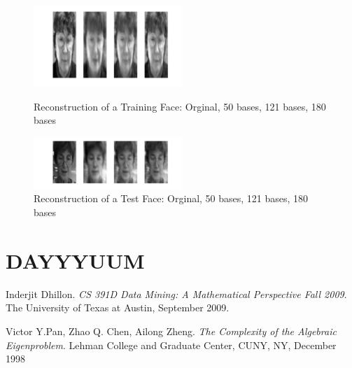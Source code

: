 \documentclass[10pt,twocolumn,letterpaper]{article}
\begin{document}
\begin{figure}[H]
\begin{center}
\includegraphics[width=0.5\textwidth]{../results/Train1_reco}

  \caption{Reconstruction of a Training Face: Orginal, 50 bases, 121 bases, 180 bases \label{fig:RecoTrain1}}
  
  \includegraphics[width=0.5\textwidth]{../results/Test1_reco}

  \caption{Reconstruction of a Test Face: Orginal, 50 bases, 121 bases, 180 bases \label{fig:RecoTest1}}

\end{center}
\end{figure}


\section{DAYYYUUM}



{\small


}

\begin{thebibliography}{9}
Inderjit Dhillon. 
\textit{CS 391D Data Mining: A Mathematical Perspective Fall 2009}. 
The University of Texas at Austin, September 2009.

Victor Y.Pan, Zhao Q. Chen, Ailong Zheng. 
\textit{The Complexity of the Algebraic Eigenproblem}. 
Lehman College and Graduate Center, CUNY, NY, December 1998
\end{thebibliography}
\end{document}
